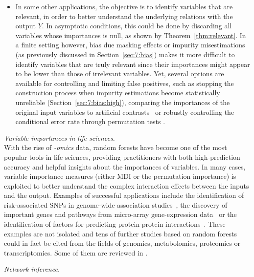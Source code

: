 \begin{description}
\begin{itemize}
    \item In some other applications, the objective is to identify variables
          that are relevant, in order to better understand the underlying
          relations with the output $Y$. In asymptotic conditions, this could
          be done by discarding all variables whose importances is null, as shown by Theorem~\ref{thm:relevant}.
          In a finite setting however, bias due masking effects or impurity misestimations (as previously discussed in Section~\ref{sec:7:bias})
          makes it more difficult to identify variables that are truly
          relevant since their importances might appear to be lower than those of irrelevant variables. Yet, several options
          are available for controlling and limiting false positives,
          such as stopping the construction process when impurity
          estimations become statistically unreliable (Section~\ref{sec:7:bias:high}), comparing the importances
          of the original input variables to artificial contrasts~\citep{tuv:2006}
          or robustly controlling the conditional error rate through permutation
          tests \citep{van:2008}.
    \end{itemize}

\item \textit{Variable importances in life sciences.} \hfill \\
    With the rise of \textit{-omics} data, random forests have become one of
    the most popular tools in life sciences, providing practitioners with both
    high-prediction accuracy and helpful insights about the importances of
    variables.
    In many cases, variable importance measures (either MDI or the permutation
    importance) is exploited to better understand the complex interaction
    effects between the inputs and the output. Examples of successful
    applications include the identification of risk-associated SNPs in
    genome-wide association studies~\citep{lunetta:2004,meng:2009,botta:2014}, the
    discovery of important genes and pathways from micro-array gene-expression
    data~\citep{pang:2006,chang:2008} or the identification of factors for
    predicting protein-protein interactions~\citep{qi:2006}. These examples are
    not isolated and tens of further studies based on random forests could in fact be cited from the fields of
    genomics, metabolomics, proteomics or transcriptomics. Some of them
    are reviewed in \citep{touw:2013,boulesteix:2012}.

\item \textit{Network inference.} \hfill \\
    \todo{}

\end{description}
